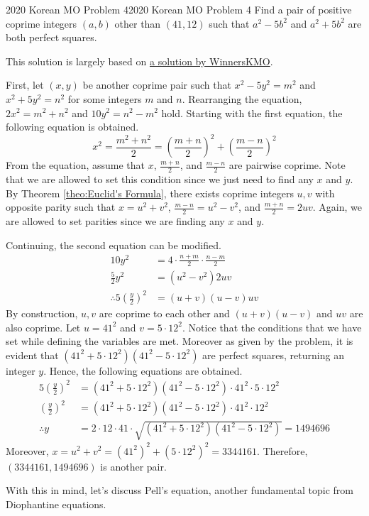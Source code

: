 \documentclass[../../main.tex]{subfiles}
\begin{document}
\begin{problem}{2020 Korean MO Problem 4}{2020 Korean MO Problem 4}
Find a pair of positive coprime integers $(a, b)$ other than
$(41, 12)$ such that $a^2 - 5b^2$ and $a^2 + 5b^2$ are both perfect
squares.
\end{problem}
This solution is largely based on
\href{https://youtu.be/4eetdspSRYw?si=U1hylcoUzUwPA66a}{a solution by WinnersKMO}.
\begin{solution}
First, let $(x, y)$ be another coprime pair such that
$x^2 - 5y^2 = m^2$ and $x^2 + 5y^2 = n^2$ for some integers
$m$ and $n$. Rearranging the equation, $2x^2 = m^2 + n^2$ and
$10y^2 = n^2 - m^2$ hold. Starting with the first equation,
the following equation is obtained.
\[
x^2
= \frac{m^2 + n^2}{2}
= \left( \frac{m + n}{2} \right)^2 + \left( \frac{m - n}{2} \right)^2
\]
From the equation, assume that $x$, $\frac{m + n}{2}$, and
$\frac{m - n}{2}$ are pairwise coprime. Note that we are allowed
to set this condition since we just need to find any $x$ and $y$.
By Theorem \ref{theo:Euclid's Formula}, there exists coprime
integers $u, v$ with opposite parity such that $x = u^2 + v^2$,
$\frac{m - n}{2} = u^2 - v^2$, and $\frac{m + n}{2} = 2uv$.
Again, we are allowed to set parities since we are finding any
$x$ and $y$.

Continuing, the second equation can be modified.
\begin{align*}
    10y^2
    &= 4 \cdot \frac{n + m}{2} \cdot \frac{n - m}{2} \\
    \frac{5}{2} y^2
    &= (u^2 - v^2) 2uv \\
    \therefore
    5 \left( \frac{y}{2} \right)^2
    &= (u + v)(u - v) uv
\end{align*}
By construction, $u, v$ are coprime to each other and $(u + v)(u - v)$
and $uv$ are also coprime. Let $u = 41^2$ and $v = 5 \cdot 12^2$.
Notice that the conditions that we have set while defining the
variables are met. Moreover as given by the problem, it is evident
that $(41^2 + 5 \cdot 12^2)(41^2 - 5 \cdot 12^2)$ are perfect
squares, returning an integer $y$. Hence, the following equations
are obtained.
\begin{align*}
    5 \left( \frac{y}{2} \right)^2
    &= (41^2 + 5 \cdot 12^2)(41^2 - 5 \cdot 12^2)
        \cdot 41^2 \cdot 5 \cdot 12^2 \\
    \left( \frac{y}{2} \right)^2
    &= (41^2 + 5 \cdot 12^2)(41^2 - 5 \cdot 12^2)
        \cdot 41^2 \cdot 12^2 \\
    \therefore y
    &= 2 \cdot 12 \cdot 41 \cdot
        \sqrt{(41^2 + 5 \cdot 12^2)(41^2 - 5 \cdot 12^2)}
    = 1494696
\end{align*}
Moreover, $x = u^2 + v^2 = \left(41^2\right)^2 +
\left(5 \cdot 12^2\right)^2 = 3344161$. Therefore,
$(3344161, 1494696)$ is another pair.
\end{solution}

With this in mind, let's discuss Pell's equation, another fundamental
topic from Diophantine equations.
\end{document}
